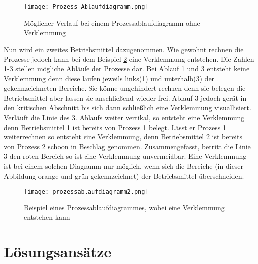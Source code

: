 \begin{figure}[H]
\caption{Möglicher Verlauf bei einem Prozessablaufdiagramm ohne Verklemmung}
\label{fig:normales_Ablaufdiagramm}
\centering
\texttt{[image: Prozess\_Ablaufdiagramm.png]}
\end{figure}

Nun wird ein zweites Betriebsmittel dazugenommen. Wie gewohnt rechnen die Prozesse jedoch kann bei dem Beispiel \ref{fig:verklemmtes_ablaufdiagramm} eine Verklemmung entstehen. Die Zahlen 1-3 stellen mögliche Abläufe der Prozesse dar. Bei Ablauf 1 und 3 entsteht keine Verklemmung denn diese laufen jeweils links(1) und unterhalb(3) der gekennzeichneten Bereiche. Sie könne ungehindert rechnen denn sie belegen die Betriebsmittel aber lassen sie anschließend wieder frei. Ablauf 3 jedoch gerät in den kritischen Abschnitt bis sich dann schließlich eine Verklemmung visuallisiert. Verläuft die Linie des 3. Ablaufs weiter vertikal, so entsteht eine Verklemmung denn Betriebsmittel 1 ist bereits von Prozess 1 belegt. Lässt er Prozess 1 weiterrechnen so entsteht eine Verklemmung, denn Betriebsmittel 2 ist bereits von Prozess 2 schoon in Beschlag genommen. Zusammengefasst, betritt die Linie 3 den roten Bereich so ist eine Verklemmung unvermeidbar.
Eine Verklemmung ist bei einem solchen Diagramm nur möglich, wenn sich die Bereiche (in dieser Abbildung orange und grün gekennzeichnet) der Betriebsmittel überschneiden.

\begin{figure}[H]
\caption{Beispiel eines Prozessablaufdiagrammes, wobei eine Verklemmung entstehen kann}
\label{fig:verklemmtes_ablaufdiagramm}
\centering
\texttt{[image: prozessablaufdiagramm2.png]}
\end{figure}

\section{Lösungsansätze}
\label{lösung}

